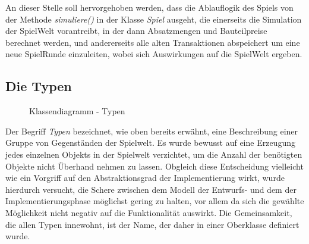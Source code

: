 An dieser Stelle soll hervorgehoben werden, dass die Ablauflogik des Spiels von der Methode \textit{simuliere()} in der Klasse \textit{Spiel} ausgeht, die einerseits die Simulation der SpielWelt vorantreibt, in der dann Absatzmengen und Bauteilpreise berechnet werden, und andererseits alle alten Transaktionen abspeichert um eine neue SpielRunde einzuleiten, wobei sich Auswirkungen auf die SpielWelt ergeben.

\subsection{Die Typen}
\begin{figure}[htb]
     \centering
     \caption{Klassendiagramm - Typen}
     \label{img:fachkonzept-entwurf-typ}
\end{figure}

Der Begriff \textit{Typen} bezeichnet, wie oben bereits erwähnt, eine Beschreibung einer Gruppe von Gegenständen der Spielwelt. Es wurde bewusst auf eine Erzeugung jedes einzelnen Objekts in der Spielwelt verzichtet, um die Anzahl der benötigten Objekte nicht Überhand nehmen zu lassen. Obgleich diese Entscheidung vielleicht wie ein Vorgriff auf den Abstraktionsgrad der Implementierung wirkt, wurde hierdurch versucht, die Schere zwischen dem Modell der Entwurfs- und dem der Implementierungsphase möglichst gering zu halten, vor allem da sich die gewählte Möglichkeit nicht negativ auf die Funktionalität auswirkt. Die Gemeinsamkeit, die allen Typen innewohnt, ist der Name, der daher in einer Oberklasse definiert wurde.

